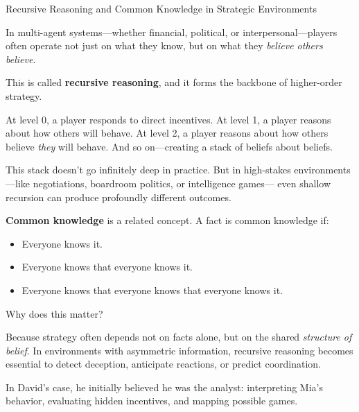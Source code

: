 \begin{TechnicalSidebar}{Recursive Reasoning and Common Knowledge in Strategic Environments}

    In multi-agent systems—whether financial, political, or interpersonal—players often operate 
    not just on what they know, but on what they \emph{believe others believe}.

    \medskip
    
    This is called \textbf{recursive reasoning}, and it forms the backbone of higher-order strategy.
    
    \medskip
    
    At level 0, a player responds to direct incentives.  
    At level 1, a player reasons about how others will behave.  
    At level 2, a player reasons about how others believe \emph{they} will behave.  
    And so on—creating a stack of beliefs about beliefs.

    \medskip
    
    This stack doesn’t go infinitely deep in practice.  
    But in high-stakes environments—like negotiations, boardroom politics, or intelligence games—
    even shallow recursion can produce profoundly different outcomes.
    
    \medskip
    
    \textbf{Common knowledge} is a related concept.  
    A fact is common knowledge if:

    \medskip

    \begin{itemize}
        \item Everyone knows it.
        \item Everyone knows that everyone knows it.
        \item Everyone knows that everyone knows that everyone knows it.
    \end{itemize}

    \medskip
    
    Why does this matter?

    \medskip
    
    Because strategy often depends not on facts alone, but on the shared \emph{structure of belief}.  
    In environments with asymmetric information, recursive reasoning becomes essential to detect 
    deception, anticipate reactions, or predict coordination.
    
    \medskip
    
    In David’s case, he initially believed he was the analyst:
    interpreting Mia’s behavior, evaluating hidden incentives, and mapping possible games.


\end{TechnicalSidebar}
